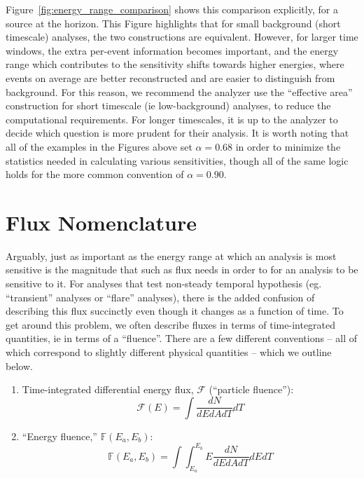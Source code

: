 \documentclass[a4paper,11pt]{article}
\begin{document}
Figure~\ref{fig:energy_range_comparison} shows this comparison explicitly, for a source at the horizon. This Figure highlights that for small background (short timescale) analyses, the two constructions are equivalent. However, for larger time windows, the extra per-event information becomes important, and the energy range which contributes to the sensitivity shifts towards higher energies, where events on average are better reconstructed and are easier to distinguish from background. For this reason, we recommend the analyzer use the ``effective area'' construction for short timescale (ie low-background) analyses, to reduce the computational requirements. For longer timescales, it is up to the analyzer to decide which question is more prudent for their analysis. It is worth noting that all of the examples in the Figures above set $\alpha=0.68$ in order to minimize the statistics needed in calculating various sensitivities, though all of the same logic holds for the more common convention of $\alpha=0.90$. 

\section{Flux Nomenclature}
Arguably, just as important as the energy range at which an analysis is most sensitive is the magnitude that such as flux needs in order to for an analysis to be sensitive to it. For analyses that test non-steady temporal hypothesis (eg. ``transient'' analyses or ``flare'' analyses), there is the added confusion of describing this flux succinctly even though it changes as a function of time. To get around this problem, we often describe fluxes in terms of time-integrated quantities, ie in terms of a ``fluence''. There are a few different conventions -- all of which correspond to slightly different physical quantities -- which we outline below.

\begin{enumerate}
    \item Time-integrated differential energy flux, $\mathcal{F}$ (``particle fluence''):
    \begin{equation}
        \mathcal{F}(E) = \int \frac{dN}{dEdAdT} dT
    \end{equation}
    \item ``Energy fluence,'' $\mathbb{F}(E_a, E_b)$:
    \begin{equation}
        \mathbb{F}(E_a, E_b) = \int\int_{E_a}^{E_b} E \frac{dN}{dEdAdT} dEdT
    \end{equation}
\end{enumerate}
\end{document}
